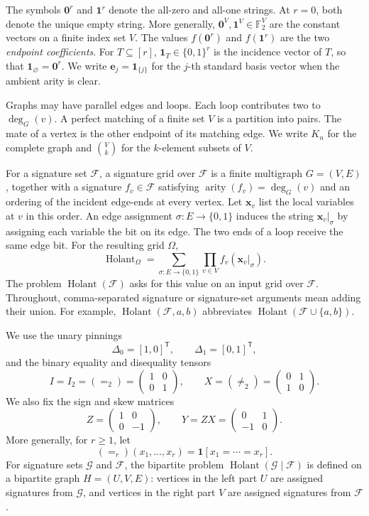 \documentclass[11pt,letterpaper,onecolumn]{article}
\theoremstyle{plain}
\theoremstyle{definition}
\theoremstyle{remark}
\newcommand{\Ftwo}{\mathbb F_2}
\newcommand{\cF}{\mathcal F}
\newcommand{\cG}{\mathcal G}
\newcommand{\Holant}{\operatorname{Holant}}
\newcommand{\arity}{\operatorname{arity}}
\newcommand{\Eq}{=}
\newcommand{\Neq}{\neq}
\newcommand{\one}{\mathbf 1}
\newcommand{\zero}{\mathbf 0}
\newcommand{\DeltaZero}{\Delta_0}
\newcommand{\DeltaOne}{\Delta_1}
\begin{document}
The symbols \(\zero^r\) and \(\one^r\) denote the all-zero and all-one
strings. At \(r=0\), both denote the unique empty string.  More generally,
\(\zero^V,\one^V\in\Ftwo^V\) are the constant vectors on a finite index set
\(V\).  The values \(f(\zero^r)\) and \(f(\one^r)\) are the two
\emph{endpoint coefficients}.  For \(T\subseteq[r]\),
\(\one_T\in\{0,1\}^r\) is the incidence vector of \(T\), so that
\(\one_\varnothing=\zero^r\).  We write \({\mathbf e}_j=\one_{\{j\}}\) for the
\(j\)-th standard basis vector when the ambient arity is clear.

Graphs may have parallel edges and loops. Each loop contributes two to
\(\deg_G(v)\).  A perfect matching of a finite set \(V\) is a partition
into pairs.  The mate of a vertex is the other endpoint of its matching
edge.  We write \(K_n\) for the complete graph and \(\binom Vk\) for the
\(k\)-element subsets of \(V\).

For a signature set \(\cF\), a signature grid over \(\cF\) is a finite
	multigraph \(G=(V,E)\),
	together with a signature \(f_v\in\cF\) satisfying
	\(\arity(f_v)=\deg_G(v)\) and an ordering of the incident
	edge-ends at every vertex.  Let \(\mathbf x_v\) list the local variables at \(v\) in this order.
	An edge assignment \(\sigma:E\to\{0,1\}\) induces the string
	\(\left.\mathbf x_v\right|_\sigma\) by assigning each variable the bit on its edge.
	The two ends of a loop receive the same edge bit.
	For the resulting grid \(\Omega\),
	\begin{equation*}
		\Holant_\Omega
		=
		\sum_{\sigma:E\to\{0,1\}}
		\prod_{v\in V}
		f_v(\left.\mathbf x_v\right|_\sigma).
	\end{equation*}
	The problem \(\Holant(\cF)\) asks for this value on an input grid over
	\(\cF\).
	Throughout, comma-separated signature or signature-set arguments mean adding
	their union. For example, \(\Holant(\cF,a,b)\) abbreviates
	\(\Holant(\cF\cup\{a,b\})\).

We use the unary pinnings
	\[
	\DeltaZero=[1,0]^{\mathsf T},
	\qquad
	\DeltaOne=[0,1]^{\mathsf T},
	\]
	and the binary equality and disequality tensors
	\[
	I=I_2=(\Eq_2)=
	\begin{pmatrix}1&0\\0&1\end{pmatrix},
	\qquad
	X=(\Neq_2)=
	\begin{pmatrix}0&1\\1&0\end{pmatrix}.
	\]
	We also fix the sign and skew matrices
	\[
	Z=\begin{pmatrix}1&0\\0&-1\end{pmatrix},
	\qquad
	Y=ZX=\begin{pmatrix}0&1\\-1&0\end{pmatrix}.
	\]
	More generally, for \(r\ge1\), let
	\[
	(\Eq_r)(x_1,\ldots,x_r)=\one[x_1=\cdots=x_r].
	\]
	For signature sets \(\cG\) and \(\cF\), the bipartite problem
	\(\Holant(\cG\mid\cF)\) is defined on a bipartite graph
	\(H=(U,V,E)\): vertices in the left part \(U\) are assigned signatures
	from \(\cG\), and vertices in the right part \(V\) are assigned signatures
	from \(\cF\).
\end{document}

